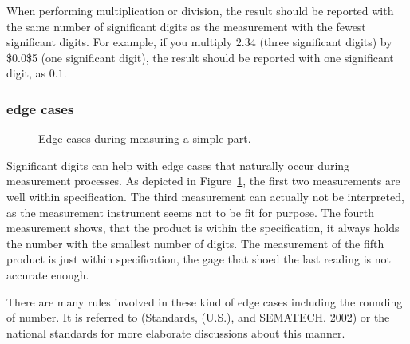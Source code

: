 \documentclass[
  a4paper,
]{scrbook}
\begin{document}
When performing multiplication or division, the result should be
reported with the same number of significant digits as the measurement
with the fewest significant digits. For example, if you multiply
\(2.34\) (three significant digits) by \$0.0\$5 (one significant digit),
the result should be reported with one significant digit, as \(0.1\).

\subsubsection{edge cases}\label{edge-cases}

\begin{figure}[ht]


\caption{\label{fig-edge-case}Edge cases during measuring a simple
part.}

\end{figure}%

Significant digits can help with edge cases that naturally occur during
measurement processes. As depicted in Figure~\ref{fig-edge-case}, the
first two measurements are well within specification. The third
measurement can actually not be interpreted, as the measurement
instrument seems not to be fit for purpose. The fourth measurement
shows, that the product is within the specification, it always holds the
number with the smallest number of digits. The measurement of the fifth
product is just within specification, the gage that shoed the last
reading is not accurate enough.

There are many rules involved in these kind of edge cases including the
rounding of number. It is referred to (Standards, (U.S.), and SEMATECH.
2002) or the national standards for more elaborate discussions about
this manner.
\end{document}
